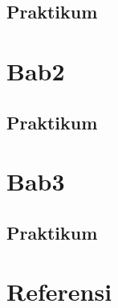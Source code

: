 \documentclass[
]{book}
\begin{document}
\hypertarget{praktikum}{%
\section{Praktikum}\label{praktikum}}

\hypertarget{bab2}{%
\chapter{Bab2}\label{bab2}}

\hypertarget{praktikum-1}{%
\section{Praktikum}\label{praktikum-1}}

\hypertarget{bab3}{%
\chapter{Bab3}\label{bab3}}

\hypertarget{praktikum-2}{%
\section{Praktikum}\label{praktikum-2}}

\hypertarget{referensi}{%
\chapter{Referensi}\label{referensi}}

  
\end{document}
